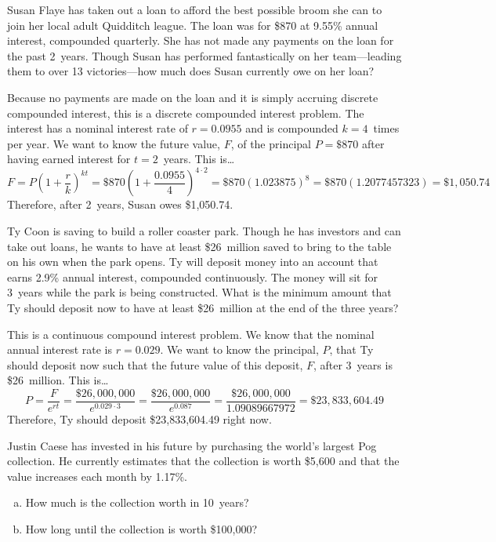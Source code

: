 \documentclass[11pt,letterpaper]{article}
\begin{document}
\newpage



 Susan Flaye has taken out a loan to afford the best possible broom she can to join her local adult Quidditch league. The loan was for \$870 at 9.55\% annual interest, compounded quarterly. She has not made any payments on the loan for the past 2~years. Though Susan has performed fantastically on her team---leading them to over 13 victories---how much does Susan currently owe on her loan? \pspace

\sol Because no payments are made on the loan and it is simply accruing discrete compounded interest, this is a discrete compounded interest problem. The interest has a nominal interest rate of $r= 0.0955$ and is compounded $k= 4$~times per year. We want to know the future value, $F$, of the principal $P= \$870$ after having earned interest for $t= 2$~years. This is\dots
	\[
	F= P \left(1 + \dfrac{r}{k} \right)^{kt}= \$870 \left(1 + \dfrac{0.0955}{4} \right)^{4 \cdot 2}= \$870 (1.023875)^8= \$870(1.2077457323)= \$1,\!050.74
	\] \pspace
Therefore, after 2~years, Susan owes \$1,050.74. 



\newpage



 Ty Coon is saving to build a roller coaster park. Though he has investors and can take out loans, he wants to have at least \$26~million saved to bring to the table on his own when the park opens. Ty will deposit money into an account that earns 2.9\% annual interest, compounded continuously. The money will sit for 3~years while the park is being constructed. What is the minimum amount that Ty should deposit now to have at least \$26~million at the end of the three years? \pspace

\sol This is a continuous compound interest problem. We know that the nominal annual interest rate is $r= 0.029$. We want to know the principal, $P$, that Ty should deposit now such that the future value of this deposit, $F$, after 3~years is \$26~million. This is\dots
	\[
	P= \dfrac{F}{e^{rt}}= \dfrac{\$26,\!000,\!000}{e^{0.029 \cdot 3}}= \dfrac{\$26,\!000,\!000}{e^{0.087}}= \dfrac{\$26,\!000,\!000}{1.09089667972}= \$23,\!833,\!604.49
	\] \pspace
Therefore, Ty should deposit \$23,833,604.49 right now. 



\newpage



 Justin Caese has invested in his future by purchasing the world's largest Pog collection. He currently estimates that the collection is worth \$5,600 and that the value increases each month by 1.17\%.
	\begin{enumerate}[(a)]
	\item How much is the collection worth in 10~years?
	\item How long until the collection is worth \$100,000?
	\end{enumerate} \pspace
\end{document}
